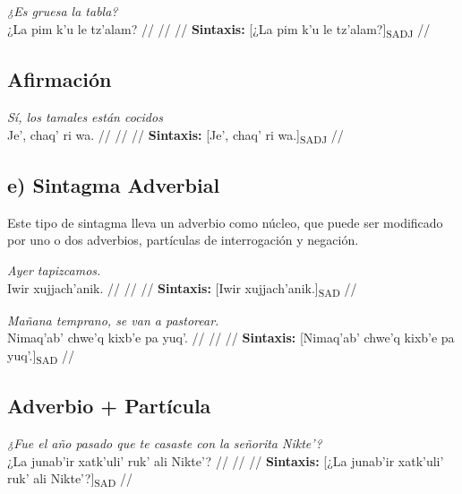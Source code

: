 \documentclass{article}%
\begin{document}
%
\par\medskip%
\ex
\textit{¿Es gruesa la tabla?} \\
\begingl
\gla ¿La pim k’u le tz’alam? //
\glb  //
\glc  //
\glft \textbf{Sintaxis:} [¿La pim k’u le tz’alam?]\textsubscript{SADJ} //
\endgl
\xe
%
\medskip%
\subsection{Afirmación}%
\label{subsec:Afirmacin}%

%
\par\medskip%
\ex
\textit{Sí, los tamales están cocidos} \\
\begingl
\gla Je’, chaq’ ri wa. //
\glb  //
\glc  //
\glft \textbf{Sintaxis:} [Je’, chaq’ ri wa.]\textsubscript{SADJ} //
\endgl
\xe
%
\medskip%
\subsection{e) Sintagma Adverbial}%
\label{subsec:e)SintagmaAdverbial}%

%
Este tipo de sintagma lleva un adverbio como núcleo, que puede ser modificado por uno %
o dos adverbios, partículas de interrogación y negación. %
\par\medskip%
\ex
\textit{Ayer tapizcamos.} \\
\begingl
\gla Iwir xujjach’anik. //
\glb  //
\glc  //
\glft \textbf{Sintaxis:} [Iwir xujjach’anik.]\textsubscript{SAD} //
\endgl
\xe
%
\medskip%
\par\medskip%
\ex
\textit{Mañana temprano, se van a pastorear.} \\
\begingl
\gla Nimaq’ab’ chwe’q kixb’e pa yuq’. //
\glb  //
\glc  //
\glft \textbf{Sintaxis:} [Nimaq’ab’ chwe’q kixb’e pa yuq’.]\textsubscript{SAD} //
\endgl
\xe
%
\medskip%
\subsection{Adverbio + Partícula}%
\label{subsec:Adverbio+Partcula}%

%
\par\medskip%
\ex
\textit{¿Fue el año pasado que te casaste con la señorita Nikte’?} \\
\begingl
\gla ¿La junab’ir xatk’uli’ ruk’ ali Nikte’? //
\glb  //
\glc  //
\glft \textbf{Sintaxis:} [¿La junab’ir xatk’uli’ ruk’ ali Nikte’?]\textsubscript{SAD} //
\endgl
\xe
%
\medskip

%
\end{document}
